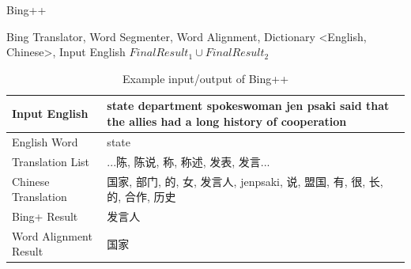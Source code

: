 \begin{algorithm}[ht]
\caption{Bing++}
\label{algorithm:wsd_5}
\begin{algorithmic}
\REQUIRE Bing Translator, Word Segmenter, Word Alignment, Dictionary \textless English, Chinese\textgreater, Input English
        \ENDIF
    \ENDFOR
        \ENDIF
    \ENDFOR
        \ENDIF
    \ENDFOR
\ENDIF
\RETURN $FinalResult_1 \cup FinalResult_2$
\end{algorithmic}
\end{algorithm}

\begin{table}[ht]
    \caption{Example input/output of Bing++}
    \begin{center}
    \begin{tabular}{| p{2.5cm} | p{4cm} |}
        \hline
        Input English & state department spokeswoman jen psaki said that the allies had a long history of cooperation\\
        \hline
        English Word & state \\
        \hline
        Translation List & \parbox[t]{4cm}{...陈, 陈说, 称, 称述, 发表, 发言...}\\
        \hline
        Chinese Translation & 国家, 部门, 的, 女, 发言人, jenpsaki, 说, 盟国, 有, 很, 长, 的, 合作, 历史\\
        \hline
        Bing+ Result & 发言人\\
        \hline
        Word Alignment Result & 国家\\
        \hline
    \end{tabular}
    \end{center}
\end{table}

